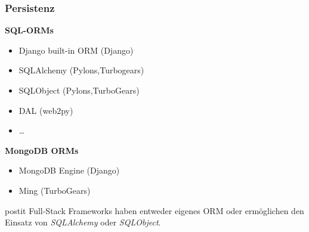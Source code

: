 \documentclass[
    t,
    smaller,
    compress,
    xcolor=svgnames,            %
    table,
]{beamer}
\newenvironment{beamerpostit}[1]%
{\begin{beamercolorbox}[wd=\textwidth,sep=2pt,rounded=true,shadow=true]{postit} #1}%
{\end{beamercolorbox}}%
\begin{document}
%
%





\begin{frame}
  \frametitle{Persistenz}

    \textbf{SQL-ORMs}
    \begin{itemize}[<1->]
        \item Django built-in ORM (Django)
        \item SQLAlchemy (Pylons,Turbogears) %
        \item SQLObject (Pylons,TurboGears)
        \item DAL (web2py)
        \item \dots
     \end{itemize}
     \textbf{MongoDB ORMs}
    \begin{itemize}[<1->]
        \item MongoDB Engine (Django)
        \item Ming (TurboGears)
    \end{itemize}

  \vspace{12pt}
  \begin{beamerpostit}
     Full-Stack Frameworks haben entweder eigenes ORM oder ermöglichen den Einsatz von \textit{SQLAlchemy} oder \textit{SQLObject}.
  \end{beamerpostit}

\end{frame}
\end{document}
